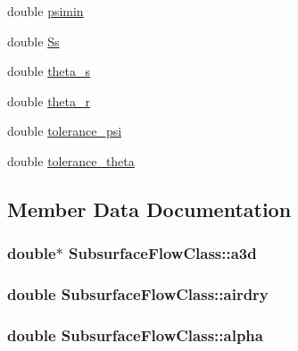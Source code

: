 \begin{DoxyCompactItemize}
\item 
double \hyperlink{class_subsurface_flow_class_a7df0f16e47f8645625e02bf2873bcf00}{psimin}
\item 
double \hyperlink{class_subsurface_flow_class_a685da1e09d90f7fc81e59be519709af9}{Ss}
\item 
double \hyperlink{class_subsurface_flow_class_a5d2229482fd827d67fba5473d496f18c}{theta\+\_\+s}
\item 
double \hyperlink{class_subsurface_flow_class_a9db975a5c9c2b53e4313b332de0ae2b0}{theta\+\_\+r}
\item 
double \hyperlink{class_subsurface_flow_class_a2a169c4a878780972906d816c9a35db4}{tolerance\+\_\+psi}
\item 
double \hyperlink{class_subsurface_flow_class_a54a10e0a2528ee4283c7df9d0eebaaed}{tolerance\+\_\+theta}
\end{DoxyCompactItemize}


\subsection{Member Data Documentation}
\subsubsection[{\texorpdfstring{a3d}{a3d}}]{\setlength{\rightskip}{0pt plus 5cm}double$\ast$ Subsurface\+Flow\+Class\+::a3d}\hypertarget{class_subsurface_flow_class_a5dc16f584cc44bf84354f1b27961ef37}{}\label{class_subsurface_flow_class_a5dc16f584cc44bf84354f1b27961ef37}
\subsubsection[{\texorpdfstring{airdry}{airdry}}]{\setlength{\rightskip}{0pt plus 5cm}double Subsurface\+Flow\+Class\+::airdry}\hypertarget{class_subsurface_flow_class_a447d38965e672eb28361bfc29c697791}{}\label{class_subsurface_flow_class_a447d38965e672eb28361bfc29c697791}
\subsubsection[{\texorpdfstring{alpha}{alpha}}]{\setlength{\rightskip}{0pt plus 5cm}double Subsurface\+Flow\+Class\+::alpha}\hypertarget{class_subsurface_flow_class_a30dae2b3bb6dabb3a3238e761672c205}{}\label{class_subsurface_flow_class_a30dae2b3bb6dabb3a3238e761672c205}
